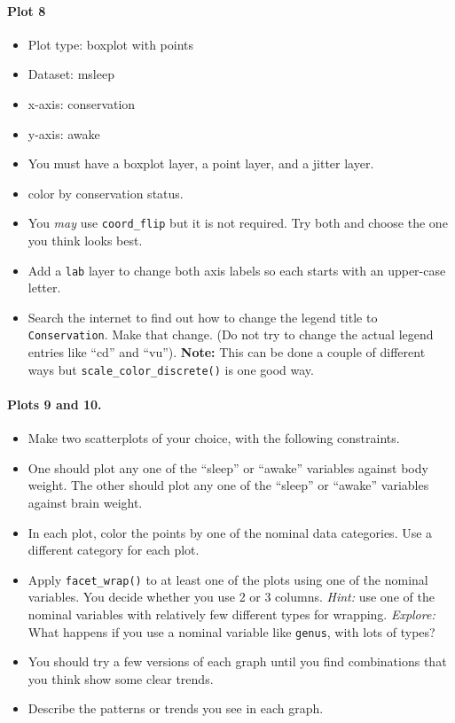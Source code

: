 \documentclass[]{article}
\providecommand{\tightlist}{%
  \setlength{\itemsep}{0pt}\setlength{\parskip}{0pt}}
\let\oldparagraph\paragraph
\renewcommand{\paragraph}[1]{\oldparagraph{#1}\mbox{}}
\begin{document}
\hypertarget{plot-8}{%
\paragraph{Plot 8}\label{plot-8}}

\begin{itemize}
\tightlist
\item
  Plot type: boxplot with points
\item
  Dataset: msleep
\item
  x-axis: conservation
\item
  y-axis: awake
\item
  You must have a boxplot layer, a point layer, and a jitter layer.
\item
  color by conservation status.
\item
  You \emph{may} use \texttt{coord\_flip} but it is not required. Try
  both and choose the one you think looks best.
\item
  Add a \texttt{lab} layer to change both axis labels so each starts
  with an upper-case letter.
\item
  Search the internet to find out how to change the legend title to
  \texttt{Conservation}. Make that change. (Do not try to change the
  actual legend entries like ``cd'' and ``vu''). \textbf{Note:} This can
  be done a couple of different ways but
  \texttt{scale\_color\_discrete()} is one good way.
\end{itemize}

\hypertarget{plots-9-and-10.}{%
\paragraph{Plots 9 and 10.}\label{plots-9-and-10.}}

\begin{itemize}
\item
  Make two scatterplots of your choice, with the following constraints.
\item
  One should plot any one of the ``sleep'' or ``awake'' variables
  against body weight. The other should plot any one of the ``sleep'' or
  ``awake'' variables against brain weight.
\item
  In each plot, color the points by one of the nominal data categories.
  Use a different category for each plot.
\item
  Apply \texttt{facet\_wrap()} to at least one of the plots using one of
  the nominal variables. You decide whether you use 2 or 3 columns.
  \emph{Hint:} use one of the nominal variables with relatively few
  different types for wrapping. \emph{Explore:} What happens if you use
  a nominal variable like \texttt{genus}, with lots of types?
\item
  You should try a few versions of each graph until you find
  combinations that you think show some clear trends.
\item
  Describe the patterns or trends you see in each graph.
\end{itemize}
\end{document}
